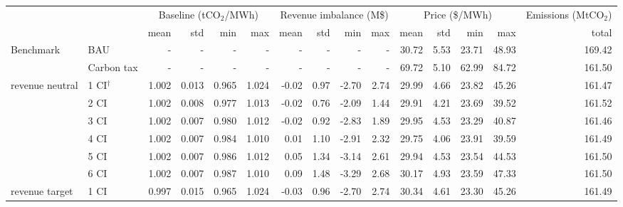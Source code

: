 \begin{tabular}{ll*{13}{r}}
\toprule
              &      & \multicolumn{4}{c}{Baseline (tCO$_{2}$/MWh)} & \multicolumn{4}{c}{Revenue imbalance (M\$)} & \multicolumn{4}{c}{Price (\$/MWh)} & Emissions (MtCO$_{2}$) \\
              &      &                     mean &    std &    min &    max &                    mean &    std &     min &    max &           mean &   std &    min &    max &                  total \\
\midrule
Benchmark & BAU &                        - &      - &      - &      - &                       - &      - &       - &      - &          30.72 &  5.53 &  23.71 &  48.93 &                 169.42 \\
              & Carbon tax &                        - &      - &      - &      - &                       - &      - &       - &      - &          69.72 &  5.10 &  62.99 &  84.72 &                 161.50 \\
revenue neutral & 1 CI$^{\dagger}$ &                    1.002 &  0.013 &  0.965 &  1.024 &                   -0.02 &   0.97 &   -2.70 &   2.74 &          29.99 &  4.66 &  23.82 &  45.26 &                 161.47 \\
              & 2 CI &                    1.002 &  0.008 &  0.977 &  1.013 &                   -0.02 &   0.76 &   -2.09 &   1.44 &          29.91 &  4.21 &  23.69 &  39.52 &                 161.52 \\
              & 3 CI &                    1.002 &  0.007 &  0.980 &  1.012 &                   -0.02 &   0.92 &   -2.83 &   1.89 &          29.95 &  4.53 &  23.29 &  40.87 &                 161.46 \\
              & 4 CI &                    1.002 &  0.007 &  0.984 &  1.010 &                    0.01 &   1.10 &   -2.91 &   2.32 &          29.75 &  4.06 &  23.91 &  39.59 &                 161.49 \\
              & 5 CI &                    1.002 &  0.007 &  0.986 &  1.012 &                    0.05 &   1.34 &   -3.14 &   2.61 &          29.94 &  4.53 &  23.54 &  44.53 &                 161.50 \\
              & 6 CI &                    1.002 &  0.007 &  0.987 &  1.010 &                    0.09 &   1.48 &   -3.29 &   2.68 &          30.17 &  4.93 &  23.59 &  47.33 &                 161.50 \\
revenue target & 1 CI &                    0.997 &  0.015 &  0.965 &  1.024 &                   -0.03 &   0.96 &   -2.70 &   2.74 &          30.34 &  4.61 &  23.30 &  45.26 &                 161.49 \\

\end{tabular}
